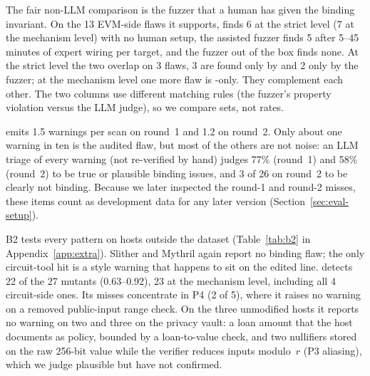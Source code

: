 The fair non-LLM comparison is the fuzzer that a human has given the binding
invariant. On the 13 EVM-side flaws it supports, \tool{} finds 6 at the
strict level (7 at the mechanism level) with no human setup, the assisted
fuzzer finds 5 after 5--45 minutes of expert wiring per target, and the
fuzzer out of the box finds none. At the strict level the two overlap on 3
flaws, 3 are found only by \tool{} and 2 only by the fuzzer; at the
mechanism level one more flaw is \tool{}-only. They complement each other.
The two columns use different matching rules (the fuzzer's property
violation versus the LLM judge), so we compare sets, not rates.

\tool{} emits 1.5 warnings per scan on round~1 and 1.2 on round~2. Only
about one warning in ten is the audited flaw, but most of the others are not
noise: an LLM triage of every warning (not re-verified by hand) judges 77\%
(round~1) and 58\% (round~2) to be true or plausible binding issues, and 3
of 26 on round~2 to be clearly not binding.
Because we later inspected the round-1 and round-2 misses, these items count
as development data for any later version (Section~\ref{sec:eval-setup}).


B2 tests every pattern on hosts outside the dataset (Table~\ref{tab:b2} in
Appendix~\ref{app:extra}). Slither and Mythril again report no binding flaw;
the only circuit-tool hit is a style warning that happens to sit on the
edited line. \tool{} detects 22 of the 27 mutants (0.63--0.92), 23 at the
mechanism level, including all 4 circuit-side ones. Its misses concentrate in
P4 (2 of 5), where it raises no warning on a removed public-input range
check. On the three unmodified hosts it reports no warning on two and three
on the privacy vault: a loan amount that the host documents as policy,
bounded by a loan-to-value check, and two nullifiers stored on the raw
256-bit value while the verifier reduces inputs modulo~$r$ (P3 aliasing),
which we judge plausible but have not confirmed.

